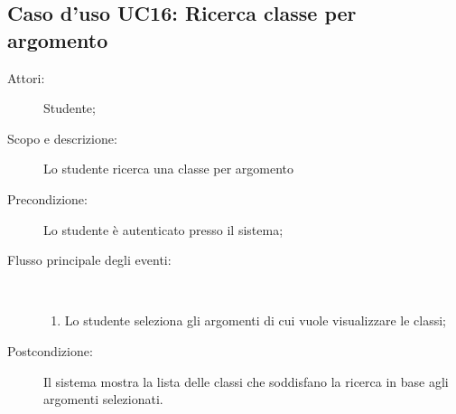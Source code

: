 \subsection{Caso d'uso UC16: Ricerca classe per argomento}\begin{description}
	\item[Attori:] Studente;
	\item[Scopo e descrizione:] Lo studente ricerca una classe per argomento
	\item[Precondizione:] Lo studente è autenticato presso il sistema;
	
	\item[Flusso principale degli eventi:] \ 
	\begin{enumerate}
		\item Lo studente seleziona gli argomenti di cui vuole visualizzare le classi;
		
	\end{enumerate}
	\item[Postcondizione:] Il sistema mostra la lista delle classi che soddisfano la ricerca in base agli argomenti selezionati.
\end{description}
\hypertarget{UC17}{}
